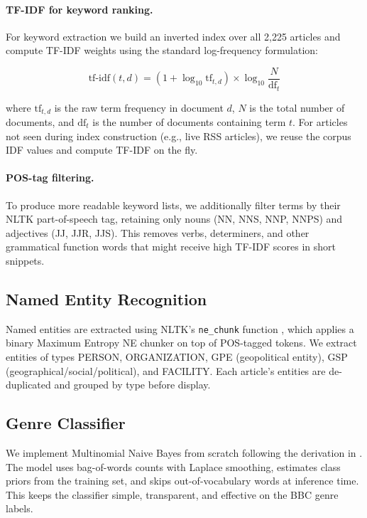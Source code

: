 \paragraph{TF-IDF for keyword ranking.}
For keyword extraction we build an inverted index over all 2,225 articles and compute TF-IDF weights using the standard log-frequency formulation:

\[
\text{tf-idf}(t, d) = (1 + \log_{10} \text{tf}_{t,d}) \times \log_{10}\frac{N}{\text{df}_t}
\]

where $\text{tf}_{t,d}$ is the raw term frequency in document $d$, $N$ is the total number of documents, and $\text{df}_t$ is the number of documents containing term $t$. For articles not seen during index construction (e.g., live RSS articles), we reuse the corpus IDF values and compute TF-IDF on the fly.

\paragraph{POS-tag filtering.}
To produce more readable keyword lists, we additionally filter terms by their NLTK part-of-speech tag, retaining only nouns (NN, NNS, NNP, NNPS) and adjectives (JJ, JJR, JJS). This removes verbs, determiners, and other grammatical function words that might receive high TF-IDF scores in short snippets.

\subsection{Named Entity Recognition}

Named entities are extracted using NLTK's \texttt{ne\_chunk} function \cite{bird2009natural}, which applies a binary Maximum Entropy NE chunker on top of POS-tagged tokens. We extract entities of types PERSON, ORGANIZATION, GPE (geopolitical entity), GSP (geographical/social/political), and FACILITY. Each article's entities are de-duplicated and grouped by type before display.

\subsection{Genre Classifier}

We implement Multinomial Naive Bayes from scratch following the derivation in \citet{mccallum1998comparison}. The model uses bag-of-words counts with Laplace smoothing, estimates class priors from the training set, and skips out-of-vocabulary words at inference time. This keeps the classifier simple, transparent, and effective on the BBC genre labels.

